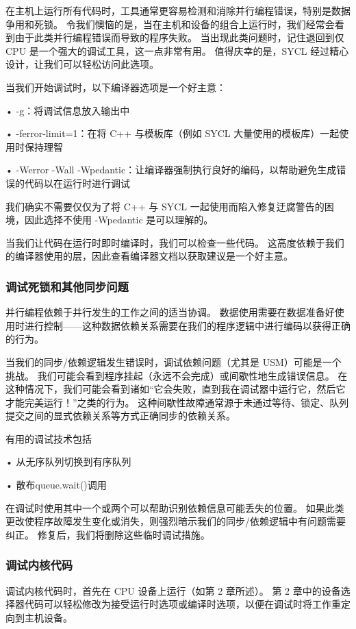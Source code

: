 在主机上运行所有代码时，工具通常更容易检测和消除并行编程错误，特别是数据争用和死锁。 令我们懊恼的是，当在主机和设备的组合上运行时，我们经常会看到由于此类并行编程错误而导致的程序失败。 当出现此类问题时，记住退回到仅 CPU 是一个强大的调试工具，这一点非常有用。 值得庆幸的是，SYCL 经过精心设计，让我们可以轻松访问此选项。

当我们开始调试时，以下编译器选项是一个好主意：

• -g：将调试信息放入输出中

• -ferror-limit=1：在将 C++ 与模板库（例如 SYCL 大量使用的模板库）一起使用时保持理智

• -Werror -Wall -Wpedantic：让编译器强制执行良好的编码，以帮助避免生成错误的代码以在运行时进行调试

我们确实不需要仅仅为了将 C++ 与 SYCL 一起使用而陷入修复迂腐警告的困境，因此选择不使用 -Wpedantic 是可以理解的。

当我们让代码在运行时即时编译时，我们可以检查一些代码。 这高度依赖于我们的编译器使用的层，因此查看编译器文档以获取建议是一个好主意。

\subsubsection{调试死锁和其他同步问题}
并行编程依赖于并行发生的工作之间的适当协调。 数据使用需要在数据准备好使用时进行控制——这种数据依赖关系需要在我们的程序逻辑中进行编码以获得正确的行为。

当我们的同步/依赖逻辑发生错误时，调试依赖问题（尤其是 USM）可能是一个挑战。 我们可能会看到程序挂起（永远不会完成）或间歇性地生成错误信息。 在这种情况下，我们可能会看到诸如“它会失败，直到我在调试器中运行它，然后它才能完美运行！”之类的行为。 这种间歇性故障通常源于未通过等待、锁定、队列提交之间的显式依赖关系等方式正确同步的依赖关系。

有用的调试技术包括

• 从无序队列切换到有序队列

• 散布queue.wait()调用

在调试时使用其中一个或两个可以帮助识别依赖信息可能丢失的位置。 如果此类更改使程序故障发生变化或消失，则强烈暗示我们的同步/依赖逻辑中有问题需要纠正。 修复后，我们将删除这些临时调试措施。

\subsubsection{调试内核代码}
调试内核代码时，首先在 CPU 设备上运行（如第 2 章所述）。 第 2 章中的设备选择器代码可以轻松修改为接受运行时选项或编译时选项，以便在调试时将工作重定向到主机设备。


